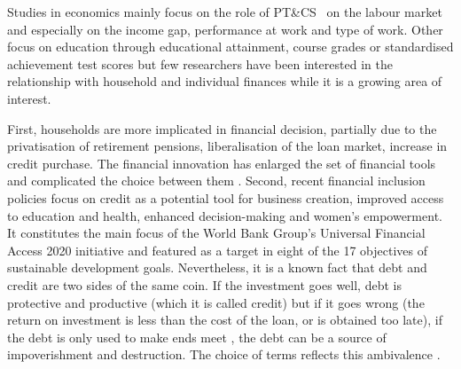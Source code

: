 \documentclass[a4paper, 12pt, onecolumn]{article}
\newcommand{\PTCS}{PT\&CS}
\begin{document}
Studies in economics mainly focus on the role of \PTCS~ on the labour market and especially on the income gap, performance at work and type of work.
Other focus on education through educational attainment, course grades or standardised achievement test scores but few researchers have been interested in the relationship with household and individual finances while it is a growing area of interest.%

First, households are more implicated in financial decision, partially due to the privatisation of retirement pensions, liberalisation of the loan market, increase in credit purchase.
The financial innovation has enlarged the set of financial tools and complicated the choice between them \citep{Guiso2013}.
Second, recent financial inclusion policies focus on credit as a potential tool for business creation, improved access to education and health, enhanced decision-making and women’s empowerment. 
It constitutes the main focus of the World Bank Group's Universal Financial Access 2020 initiative and featured as a target in eight of the 17 objectives of sustainable development goals.
Nevertheless, it is a known fact that debt and credit are two sides of the same coin.
If the investment goes well, debt is protective and productive (which it is called credit) but if it goes wrong (the return on investment is less than the cost of the loan, or is obtained too late), if the debt is only used to make ends meet \citep{Guerin2021}, the debt can be a source of impoverishment and destruction.
The choice of terms reflects this ambivalence \citep{Peebles2010}.
\end{document}
